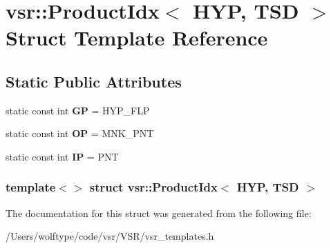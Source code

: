 \hypertarget{structvsr_1_1_product_idx_3_01_h_y_p_00_01_t_s_d_01_4}{\section{vsr\-:\-:Product\-Idx$<$ H\-Y\-P, T\-S\-D $>$ Struct Template Reference}
\label{structvsr_1_1_product_idx_3_01_h_y_p_00_01_t_s_d_01_4}
}
\subsection*{Static Public Attributes}
\begin{DoxyCompactItemize}
\item 
\hypertarget{structvsr_1_1_product_idx_3_01_h_y_p_00_01_t_s_d_01_4_aca4e38d0d6b6015fdd85f0f96bf17f1c}{static const int {\bfseries G\-P} = H\-Y\-P\-\_\-\-F\-L\-P}\label{structvsr_1_1_product_idx_3_01_h_y_p_00_01_t_s_d_01_4_aca4e38d0d6b6015fdd85f0f96bf17f1c}

\item 
\hypertarget{structvsr_1_1_product_idx_3_01_h_y_p_00_01_t_s_d_01_4_a808cf8844c934269dbee2169239c8f3e}{static const int {\bfseries O\-P} = M\-N\-K\-\_\-\-P\-N\-T}\label{structvsr_1_1_product_idx_3_01_h_y_p_00_01_t_s_d_01_4_a808cf8844c934269dbee2169239c8f3e}

\item 
\hypertarget{structvsr_1_1_product_idx_3_01_h_y_p_00_01_t_s_d_01_4_a1cde9feced928bd4b104ac1609016dd3}{static const int {\bfseries I\-P} = P\-N\-T}\label{structvsr_1_1_product_idx_3_01_h_y_p_00_01_t_s_d_01_4_a1cde9feced928bd4b104ac1609016dd3}

\end{DoxyCompactItemize}
\subsubsection*{template$<$$>$ struct vsr\-::\-Product\-Idx$<$ H\-Y\-P, T\-S\-D $>$}



The documentation for this struct was generated from the following file\-:\begin{DoxyCompactItemize}
\item 
/\-Users/wolftype/code/vsr/\-V\-S\-R/vsr\-\_\-templates.\-h\end{DoxyCompactItemize}
